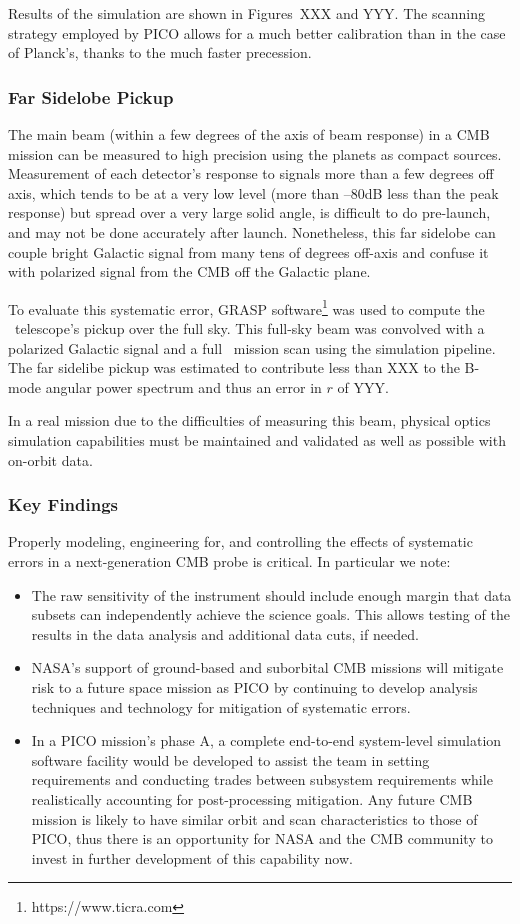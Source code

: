 \documentclass[PICOReport.tex]{subfiles}
\begin{document}
Results of the simulation are shown in Figures~XXX and YYY. The scanning strategy employed by PICO allows for a much better calibration than in the case of Planck's, thanks to the much faster precession.

\subsubsection{Far Sidelobe Pickup}
\label{sec:fsl}
The main beam (within a few degrees of the axis of beam response) in a CMB mission can be measured to high precision using the planets as compact sources.  Measurement of each detector's response to signals more than a few degrees off axis, which tends to be at a very low level (more than --80dB less than the peak response) but spread over a very large solid angle, is difficult to do pre-launch, and may not be done accurately after launch.  Nonetheless, this far sidelobe can couple bright Galactic signal from many tens of degrees off-axis and confuse it with polarized signal from the CMB off the Galactic plane.  

To evaluate this systematic error, GRASP software\footnote{https://www.ticra.com} was used to compute the \pico\ telescope's pickup over the full sky.  This full-sky beam was convolved with a polarized Galactic signal and a full \pico\ mission scan using the simulation pipeline.  The far sidelibe pickup was estimated to contribute less than XXX to the B-mode angular power spectrum and thus an error in $r$ of YYY.

In a real mission due to the difficulties of measuring this beam, physical optics simulation capabilities must be maintained and validated as well as possible with on-orbit data.

\subsubsection{Key Findings}
Properly modeling, engineering for, and controlling the effects of systematic errors in a
next-generation CMB probe is critical.  In particular we note:
\begin{itemize}
\item The raw sensitivity of the instrument should include enough margin
that data subsets can independently achieve the science goals.
This allows testing of the results in the data analysis and additional
data cuts, if needed.

\item NASA's support of ground-based and suborbital CMB missions will mitigate risk to a future space mission as PICO by continuing to develop analysis techniques and technology for mitigation of systematic errors.

\item In a PICO mission's phase A, a complete end-to-end system-level
simulation software facility would be developed to assist the team in setting 
requirements and conducting trades between subsystem requirements while
realistically accounting for post-processing mitigation.  Any future
CMB mission is likely to have similar orbit  
and scan characteristics to those of PICO, thus there is an opportunity for NASA and
the CMB community to invest in further development of this capability now.
\end{itemize}
\end{document}
